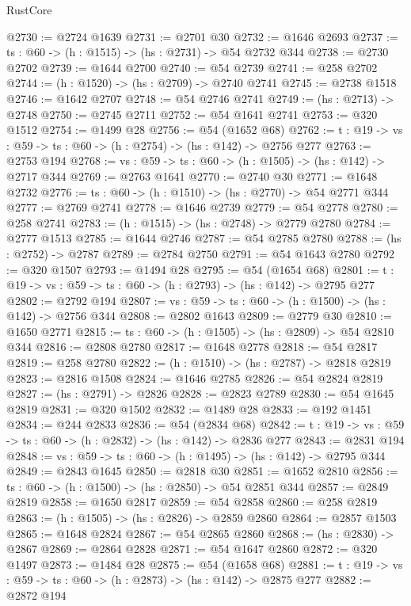 \begin{lexlean}{RustCore}
\begin{coremodule}
@2730 := @2724 @1639
@2731 := @2701 @30
@2732 := @1646 @2693
@2737 := {ts : @60} -> (h : @1515) -> (hs : @2731) -> @54 @2732 @344
@2738 := @2730 @2702
@2739 := @1644 @2700
@2740 := @54 @2739
@2741 := @258 @2702
@2744 := (h : @1520) -> (hs : @2709) -> @2740 @2741
@2745 := @2738 @1518
@2746 := @1642 @2707
@2748 := @54 @2746 @2741
@2749 := (hs : @2713) -> @2748
@2750 := @2745 @2711
@2752 := @54 @1641 @2741
@2753 := @320 @1512
@2754 := @1499 @28
@2756 := @54 (@1652 @68)
@2762 := {t : @19} -> {vs : @59} -> {ts : @60} -> (h : @2754) -> (hs : @142) -> @2756 @277
@2763 := @2753 @194
@2768 := {vs : @59} -> {ts : @60} -> (h : @1505) -> (hs : @142) -> @2717 @344
@2769 := @2763 @1641
@2770 := @2740 @30
@2771 := @1648 @2732
@2776 := {ts : @60} -> (h : @1510) -> (hs : @2770) -> @54 @2771 @344
@2777 := @2769 @2741
@2778 := @1646 @2739
@2779 := @54 @2778
@2780 := @258 @2741
@2783 := (h : @1515) -> (hs : @2748) -> @2779 @2780
@2784 := @2777 @1513
@2785 := @1644 @2746
@2787 := @54 @2785 @2780
@2788 := (hs : @2752) -> @2787
@2789 := @2784 @2750
@2791 := @54 @1643 @2780
@2792 := @320 @1507
@2793 := @1494 @28
@2795 := @54 (@1654 @68)
@2801 := {t : @19} -> {vs : @59} -> {ts : @60} -> (h : @2793) -> (hs : @142) -> @2795 @277
@2802 := @2792 @194
@2807 := {vs : @59} -> {ts : @60} -> (h : @1500) -> (hs : @142) -> @2756 @344
@2808 := @2802 @1643
@2809 := @2779 @30
@2810 := @1650 @2771
@2815 := {ts : @60} -> (h : @1505) -> (hs : @2809) -> @54 @2810 @344
@2816 := @2808 @2780
@2817 := @1648 @2778
@2818 := @54 @2817
@2819 := @258 @2780
@2822 := (h : @1510) -> (hs : @2787) -> @2818 @2819
@2823 := @2816 @1508
@2824 := @1646 @2785
@2826 := @54 @2824 @2819
@2827 := (hs : @2791) -> @2826
@2828 := @2823 @2789
@2830 := @54 @1645 @2819
@2831 := @320 @1502
@2832 := @1489 @28
@2833 := @192 @1451
@2834 := @244 @2833
@2836 := @54 (@2834 @68)
@2842 := {t : @19} -> {vs : @59} -> {ts : @60} -> (h : @2832) -> (hs : @142) -> @2836 @277
@2843 := @2831 @194
@2848 := {vs : @59} -> {ts : @60} -> (h : @1495) -> (hs : @142) -> @2795 @344
@2849 := @2843 @1645
@2850 := @2818 @30
@2851 := @1652 @2810
@2856 := {ts : @60} -> (h : @1500) -> (hs : @2850) -> @54 @2851 @344
@2857 := @2849 @2819
@2858 := @1650 @2817
@2859 := @54 @2858
@2860 := @258 @2819
@2863 := (h : @1505) -> (hs : @2826) -> @2859 @2860
@2864 := @2857 @1503
@2865 := @1648 @2824
@2867 := @54 @2865 @2860
@2868 := (hs : @2830) -> @2867
@2869 := @2864 @2828
@2871 := @54 @1647 @2860
@2872 := @320 @1497
@2873 := @1484 @28
@2875 := @54 (@1658 @68)
@2881 := {t : @19} -> {vs : @59} -> {ts : @60} -> (h : @2873) -> (hs : @142) -> @2875 @277
@2882 := @2872 @194

\end{coremodule}
\end{lexlean}

